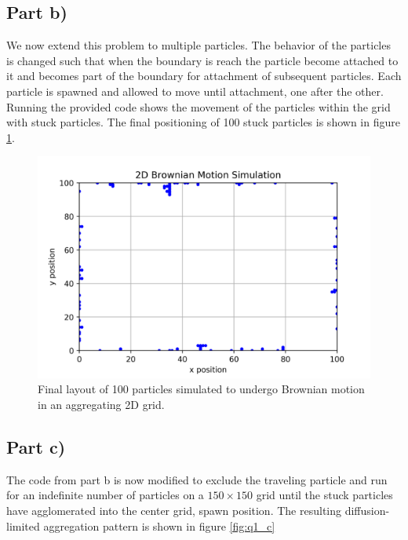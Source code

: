 \documentclass{article}
\begin{document}
\subsection{Part b)}
We now extend this problem to multiple particles. The behavior of the particles is changed such that when the boundary is reach the particle become attached to it and becomes part of the boundary for attachment of subsequent particles. Each particle is spawned and allowed to move until attachment, one after the other. Running the provided code shows the movement of the particles within the grid with stuck particles. The final positioning of 100 stuck particles is shown in figure \ref{fig:q1_b}.

\begin{figure}[H]
	\centering
	\includegraphics[width=\linewidth]{../images/brownian_trajectories_n=100.png}
	\caption{Final layout of 100 particles simulated to undergo Brownian motion in an aggregating 2D grid.}
	\label{fig:q1_b}
\end{figure}

\subsection{Part c)}
The code from part b is now modified to exclude the traveling particle and run for an indefinite number of particles on a $150\times 150$ grid until the stuck particles have agglomerated into the center grid, spawn position. The resulting diffusion-limited aggregation pattern is shown in figure \ref{fig:q1_c}
\end{document}

